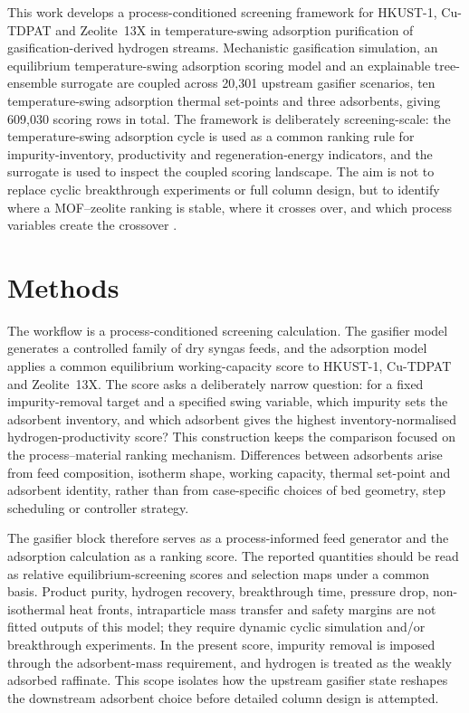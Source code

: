 \documentclass[11pt,a4paper]{article}
\newcommand{\TSA}{temperature-swing adsorption}
\begin{document}
This work develops a process-conditioned screening framework for HKUST-1, Cu-TDPAT and Zeolite~13X in \TSA{} purification of gasification-derived hydrogen streams. Mechanistic gasification simulation, an equilibrium \TSA{} scoring model and an explainable tree-ensemble surrogate are coupled across 20{,}301 upstream gasifier scenarios, ten \TSA{} thermal set-points and three adsorbents, giving 609{,}030 scoring rows in total. The framework is deliberately screening-scale: the \TSA{} cycle is used as a common ranking rule for impurity-inventory, productivity and regeneration-energy indicators, and the surrogate is used to inspect the coupled scoring landscape. The aim is not to replace cyclic breakthrough experiments or full column design, but to identify where a MOF--zeolite ranking is stable, where it crosses over, and which process variables create the crossover \citep{Lundberg2017SHAP,Delpisheh2024MLPorous}.

\section{Methods}
\label{sec:methods}

The workflow is a process-conditioned screening calculation. The gasifier
model generates a controlled family of dry syngas feeds, and the adsorption
model applies a common equilibrium working-capacity score to HKUST-1,
Cu-TDPAT and Zeolite~13X. The score asks a deliberately narrow question:
for a fixed impurity-removal target and a specified swing variable, which
impurity sets the adsorbent inventory, and which adsorbent gives the highest
inventory-normalised hydrogen-productivity score? This construction keeps
the comparison focused on the process--material ranking mechanism.
Differences between adsorbents arise from feed composition, isotherm shape,
working capacity, thermal set-point and adsorbent identity, rather than from
case-specific choices of bed geometry, step scheduling or controller strategy.

The gasifier block therefore serves as a process-informed feed generator and
the adsorption calculation as a ranking score. The reported quantities should
be read as relative equilibrium-screening scores and selection maps under a
common basis. Product purity, hydrogen recovery, breakthrough time, pressure
drop, non-isothermal heat fronts, intraparticle mass transfer and safety
margins are not fitted outputs of this model; they require dynamic cyclic
simulation and/or breakthrough experiments. In the present score, impurity
removal is imposed through the adsorbent-mass requirement, and hydrogen is
treated as the weakly adsorbed raffinate. This scope isolates how the upstream
gasifier state reshapes the downstream adsorbent choice before detailed column
design is attempted. 
\end{document}
